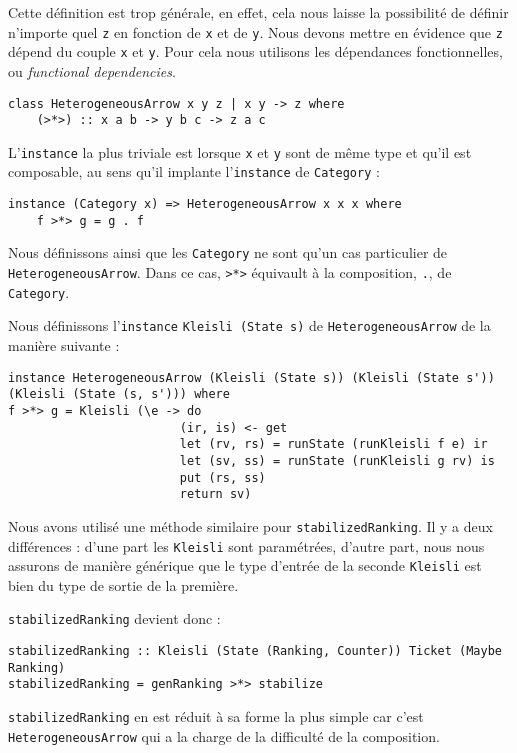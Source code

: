 \documentclass{llncs}
\newcommand{\HA}{\lstinline{HeterogeneousArrow} }
\newcommand{\HAp}{\lstinline{HeterogeneousArrow}. }
\begin{document}
Cette définition est trop générale, en effet, cela nous laisse la possibilité de
définir n'importe quel \lstinline{z} en fonction de \lstinline{x} et de \lstinline{y}.
Nous devons mettre en évidence que \lstinline{z} dépend du couple \lstinline{x} et \lstinline{y}.
Pour cela nous utilisons les dépendances fonctionnelles, ou \emph{functional dependencies}.
\begin{lstlisting}
class HeterogeneousArrow x y z | x y -> z where
    (>*>) :: x a b -> y b c -> z a c
\end{lstlisting}

L'\lstinline{instance} la plus triviale est lorsque \lstinline{x} et \lstinline{y}
sont de même type et qu'il est composable, au sens qu'il implante l'\lstinline{instance}
de \lstinline{Category} :
\begin{lstlisting}
instance (Category x) => HeterogeneousArrow x x x where
    f >*> g = g . f
\end{lstlisting}
Nous définissons ainsi que les \lstinline{Category} ne sont qu'un cas particulier
de \HAp
Dans ce cas, \lstinline{>*>} équivault à la composition, \lstinline{.}, de
\lstinline{Category}.

Nous définissons l'\lstinline{instance} \lstinline{Kleisli (State s)} de \HA de 
la manière suivante :
\begin{lstlisting}
instance HeterogeneousArrow (Kleisli (State s)) (Kleisli (State s')) (Kleisli (State (s, s'))) where
f >*> g = Kleisli (\e -> do
                        (ir, is) <- get
                        let (rv, rs) = runState (runKleisli f e) ir
                        let (sv, ss) = runState (runKleisli g rv) is
                        put (rs, ss)
                        return sv)
\end{lstlisting}
Nous avons utilisé une méthode similaire pour \lstinline{stabilizedRanking}.
Il y a deux différences : d'une part les \lstinline{Kleisli} sont paramétrées,
d'autre part, nous nous assurons de manière générique que le type d'entrée de la
seconde \lstinline{Kleisli} est bien du type de sortie de la première.

\lstinline{stabilizedRanking} devient donc :
\begin{lstlisting}
stabilizedRanking :: Kleisli (State (Ranking, Counter)) Ticket (Maybe Ranking)
stabilizedRanking = genRanking >*> stabilize
\end{lstlisting}
\lstinline{stabilizedRanking} en est réduit à sa forme la plus simple car c'est
\HA qui a la charge de la difficulté de la composition.
\end{document}

